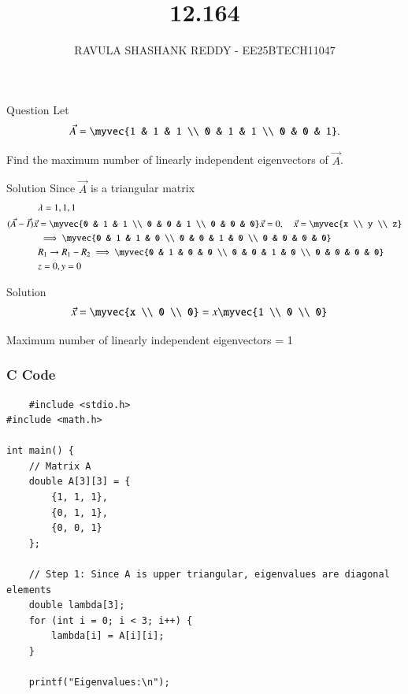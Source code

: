 \documentclass{beamer}
\title %
{12.164}
\author %
{RAVULA SHASHANK REDDY - EE25BTECH11047}
\begin{document}
	
	
	\frame{\titlepage}
	\begin{frame}{Question}
    Let 
\begin{align*}
\vec{A} = \myvec{1 & 1 & 1 \\ 0 & 1 & 1 \\ 0 & 0 & 1}.
\end{align*}

Find the maximum number of linearly independent eigenvectors of \(\vec{A}\).
\end{frame}
\begin{frame}{Solution}
    Since $\vec{A}$ is a triangular matrix
\begin{align}
 & \lambda = 1,1,1 \\
(\vec{A} - \vec{I})\vec{x} &= \myvec{0 & 1 & 1 \\ 0 & 0 & 1 \\ 0 & 0 & 0} \vec{x} = 0, \quad \vec{x} = \myvec{x \\ y \\ z} \\
&\implies \myvec{0 & 1 & 1 & 0 \\ 0 & 0 & 1 & 0 \\ 0 & 0 & 0 & 0}\\
&R_1\rightarrow{R_1-R_2}\implies \myvec{0 & 1 & 0 & 0 \\ 0 & 0 & 1 & 0 \\ 0 & 0 & 0 & 0}\\
& z = 0 , y = 0 
\end{align}
\end{frame}
\begin{frame}{Solution}
\begin{align}
\vec{x} &= \myvec{x \\ 0 \\ 0} = x \myvec{1 \\ 0 \\ 0}
\end{align}


Maximum number of linearly independent eigenvectors = 1


\end{frame}
\begin{frame}[fragile]
\frametitle{C Code}
\begin{lstlisting}
    #include <stdio.h>
#include <math.h>

int main() {
    // Matrix A
    double A[3][3] = {
        {1, 1, 1},
        {0, 1, 1},
        {0, 0, 1}
    };

    // Step 1: Since A is upper triangular, eigenvalues are diagonal elements
    double lambda[3];
    for (int i = 0; i < 3; i++) {
        lambda[i] = A[i][i];
    }

    printf("Eigenvalues:\n");
    \end{lstlisting}
    \end{frame}
\end{document}
